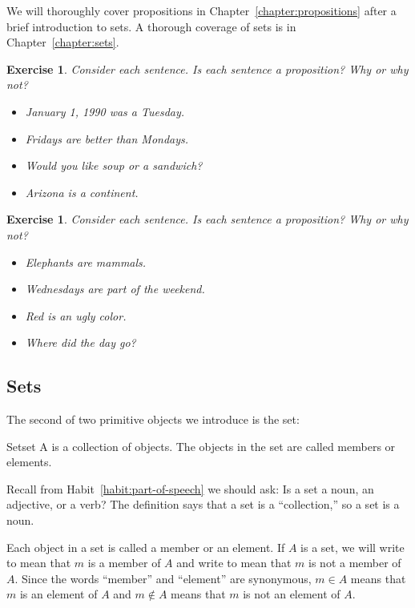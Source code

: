 \documentclass{book}
\newcounter{ekcounter}%
\theoremstyle{ekimcustom}
\newtheorem{exercise}[ekcounter]{Exercise}
\newcommand\defn[1]{{\color{blue}{\bf #1}}}
\begin{document}
We will thoroughly cover propositions in Chapter~\ref{chapter:propositions} after a brief introduction to sets. A thorough coverage of sets is in Chapter~\ref{chapter:sets}.

\begin{exercise}
Consider each sentence. Is each sentence a proposition? Why or why not?
\begin{itemize}
\item January 1, 1990 was a Tuesday.
\item Fridays are better than Mondays.
\item Would you like soup or a sandwich?
\item Arizona is a continent.
\end{itemize}
\end{exercise}

\begin{exercise}
Consider each sentence. Is each sentence a proposition? Why or why not?
\begin{itemize}
\item Elephants are mammals.
\item Wednesdays are part of the weekend.
\item Red is an ugly color.
\item Where did the day go?
\end{itemize}
\end{exercise}

\subsection{Sets}\label{subsection:sets}

The second of two primitive objects we introduce is the set:
\begin{bdefinition}{Set}{set}
A \defn{set} is a collection of objects. The objects in the set are called members or elements.
\end{bdefinition}
\begin{blanguage}{}{}
Recall from Habit~\ref{habit:part-of-speech} we should ask: Is a set a noun, an adjective, or a verb? The definition says that a set is a ``collection,'' so a set is a noun.
\end{blanguage}
Each object in a set is called a member or an element. If $A$ is a set, we will write  to mean that $m$ is a member of $A$ and write  to mean that $m$ is not a member of $A$. Since the words ``member'' and ``element'' are synonymous, $m \in A$ means that $m$ is an element of $A$ and $m \not\in A$ means that $m$ is not an element of $A$.
 
\end{document}
